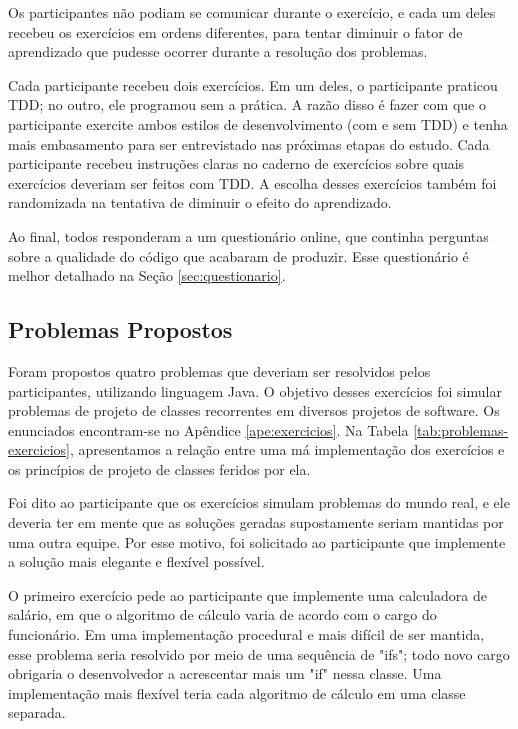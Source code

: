 Os participantes não podiam se comunicar durante o exercício, e cada um deles recebeu
os exercícios em ordens diferentes, para tentar diminuir o fator de aprendizado que 
pudesse ocorrer durante a resolução dos problemas. 

Cada participante recebeu dois exercícios. Em um deles, o participante praticou TDD; no outro,
ele programou sem a prática. A razão disso
é fazer com que o participante exercite ambos estilos de desenvolvimento (com e sem TDD)
e tenha mais embasamento para ser entrevistado nas próximas etapas do estudo. 
Cada participante recebeu instruções claras no caderno de exercícios 
sobre quais exercícios deveriam ser feitos
com TDD. A escolha desses exercícios também foi randomizada na tentativa de diminuir
o efeito do aprendizado.

Ao final, todos responderam a um questionário online, 
que continha perguntas sobre a qualidade
do código que acabaram de produzir. Esse questionário
é melhor detalhado na Seção \ref{sec:questionario}.

\subsection{Problemas Propostos}
\label{sec:exercicios}

Foram propostos quatro problemas que deveriam ser resolvidos pelos participantes, utilizando
linguagem Java. O objetivo desses exercícios foi simular problemas de projeto de classes 
recorrentes em diversos projetos de software. Os enunciados encontram-se no Apêndice 
\ref{ape:exercicios}.
Na Tabela \ref{tab:problemas-exercicios}, apresentamos a relação entre uma má
implementação dos exercícios e os princípios de projeto de classes feridos por
ela.

Foi dito ao participante que os exercícios simulam problemas do mundo real, e ele deveria
ter em mente que as soluções geradas supostamente seriam mantidas por uma outra equipe.
Por esse motivo, foi solicitado ao participante que implemente a solução mais elegante e flexível 
possível.

O primeiro exercício pede ao participante que implemente uma calculadora de salário, em que
o algoritmo de cálculo varia de acordo com o cargo do funcionário. Em uma implementação
procedural e mais difícil de ser mantida, esse problema seria resolvido por meio de uma
sequência de "ifs"; todo novo cargo obrigaria o desenvolvedor a acrescentar mais um "if" 
nessa classe. Uma implementação mais flexível teria cada algoritmo de cálculo em uma 
classe separada.


